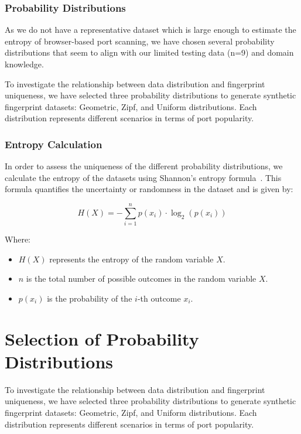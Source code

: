 \subsubsection{Probability Distributions}

As we do not have a representative dataset which is large enough to estimate the entropy of browser-based port scanning, we have chosen several probability distributions that seem to align with our limited testing data (n=9) and domain knowledge.

To investigate the relationship between data distribution and fingerprint uniqueness, we have selected three probability distributions to generate synthetic fingerprint datasets: Geometric, Zipf, and Uniform distributions. Each distribution represents different scenarios in terms of port popularity.

\subsubsection{Entropy Calculation}

In order to assess the uniqueness of the different probability distributions, we calculate the entropy of the datasets using Shannon's entropy formula~. This formula quantifies the uncertainty or randomness in the dataset and is given by:

\[
H(X) = -\sum_{i=1}^{n} p(x_i) \cdot \log_{2}(p(x_i))
\]

Where:
\begin{itemize}
  \item $H(X)$ represents the entropy of the random variable $X$.
  \item $n$ is the total number of possible outcomes in the random variable $X$.
  \item $p(x_i)$ is the probability of the $i$-th outcome $x_i$.
\end{itemize}


\section{Selection of Probability Distributions}

To investigate the relationship between data distribution and fingerprint uniqueness, we have selected three probability distributions to generate synthetic fingerprint datasets: Geometric, Zipf, and Uniform distributions. Each distribution represents different scenarios in terms of port popularity.

